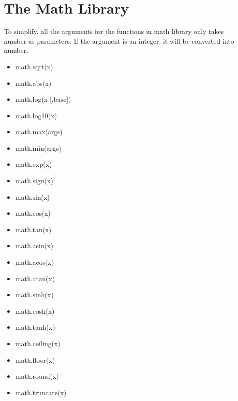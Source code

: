 \documentclass[]{article}
\begin{document}
\section{The Math Library}
To simplify, all the arguments for the functions in math library only takes number as parameters. If the argument is an integer, it will be converted into number.

\begin{itemize}
	\item math.sqrt(x)
	\item math.abs(x)
	\item math.log(x [,base])
	\item math.log10(x)
	\item math.max(args)
	\item math.min(args)
	\item math.exp(x)
	\item math.sign(x)
	\item math.sin(x)
	\item math.cos(x)
	\item math.tan(x)
	\item math.asin(x)
	\item math.acos(x)
	\item math.atan(x)
	\item math.sinh(x)
	\item math.cosh(x)
	\item math.tanh(x)
	\item math.ceiling(x)
	\item math.floor(x)
	\item math.round(x)
	\item math.truncate(x)
\end{itemize}
\end{document}
